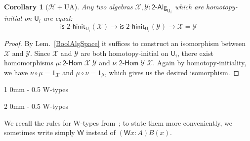\documentclass[reqno,10pt,a4paper,oneside]{amsart}
\makeatletter
\numberwithin{equation}{section}
\renewcommand{\section}{\@startsection
  {section}%
   {1}%
  {0mm}%
   {-\baselineskip}%
  {0.5\baselineskip}%
   {\Large\bfseries}}%
\renewcommand{\subsection}{\@startsection
  {subsection}%
  {2}%
  {0mm}%
  {-\baselineskip}%
  {0.5\baselineskip}%
  {\normalfont\normalsize\bf}}%
\theoremstyle{mythm}
\newtheorem{corollary}[theorem]{Corollary}
\theoremstyle{mydef}
\theoremstyle{myrmk}
\newcommand{\comp}{\circ}
\newcommand{\Hint}{\mathcal{H}}
\newcommand{\W}{\mathsf{W}}
\newcommand{\wsup}{\mathsf{sup}}
\newcommand{\wind}{\mathsf{wind}}
\newcommand{\one}{\mathsf{1}}
\newcommand{\UU}{\mathsf{U}}
\newcommand{\BoolAlg}{\mathsf{2}\text{-}\mathsf{Alg}}
\newcommand{\BoolHom}{\mathsf{2}\text{-}\mathsf{Hom}}
\newcommand{\IsBoolHInit}{\mathsf{is}\text{-}\mathsf{2}\text{-}\mathsf{hinit}}
\newcommand{\X}{\mathcal{X}}
\newcommand{\Y}{\mathcal{Y}}
\makeatother
\begin{document}
\begin{corollary}[$\Hint + \mathrm{UA}$] \label{BoolHInitIso}
Any two algebras $\X,\Y : \BoolAlg_{\UU_i}$ which are homotopy-initial on $\UU_i$ are equal:
\[ \IsBoolHInit_{\UU_i}(\X) \to \IsBoolHInit_{\UU_i}(\Y) \to \X = \Y\] 
\end{corollary}
\begin{proof}
By Lem.~\ref{BoolAlgSpace} it suffices to construct an isomorphism between $\X$ and $\Y$. Since $\X$ and $\Y$ are both homotopy-initial on $\UU_i$, there exist homomorphisms $\mu : \BoolHom \; \X \; \Y$ and $\nu : \BoolHom \; \Y \; \X$. Again by homotopy-initiality, we have $\nu \comp \mu = \one_\X$ and $\mu \comp \nu = \one_\Y$, which gives us the desired isomorphism.
\end{proof}



\newpage
\section{W-types}
\label{section:wfiles}

\subsection{W-types}

We recall the rules for W-types from~\cite{MartinLofP:inttt}; to state them more conveniently, we sometimes write simply $\W$ instead of $(\W{x : A})B(x)$.
\end{document}
